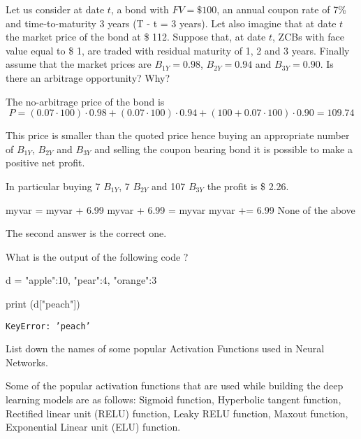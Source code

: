 \documentclass[12pt,a4paper]{exam}
\begin{document}
\question
Let us consider at date $t$, a bond with $FV = \$ 100$, an annual coupon rate of 7\% and time-to-maturity 3 years (T - t = 3 years).
Let also imagine that at date $t$ the market price of the bond at \$ 112.
Suppose that, at date $t$, ZCBs with face value equal to \$ 1, are traded with residual maturity of 1, 2 and 3 years.
Finally assume that the market prices are $B_{1Y} = 0.98$, $B_{2Y} = 0.94$ and $B_{3Y} = 0.90$.
Is there an arbitrage opportunity? Why?
\fillwithlines{3cm}
\begin{solution}
The no-arbitrage price of the bond is
\begin{equation*}
  P = (0.07\cdot100)\cdot 0.98 + (0.07\cdot100)\cdot 0.94 + (100 + 0.07\cdot100)\cdot 0.90 = 109.74
\end{equation*}

This price is smaller than the quoted price hence buying an appropriate number of $B_{1Y}$, $B_{2Y}$ and $B_{3Y}$ and selling the coupon bearing bond it is possible to make a positive net profit.

In particular buying 7 $B_{1Y}$, 7 $B_{2Y}$ and 107 $B_{3Y}$ the profit is \$ 2.26.
\end{solution}


\begin{checkboxes}
\choice myvar = myvar + 6.99
\choice myvar + 6.99 = myvar
\choice myvar += 6.99
\choice None of the above
\end{checkboxes}
\begin{solution}
The second answer is the correct one.
\end{solution}


\question
What is the output of the following code ?

\begin{ipython}
d = {"apple":10, "pear":4, "orange":3}

print (d["peach"])
\end{ipython}
\makeemptybox{3cm}
\begin{solution}
\texttt{KeyError: 'peach'}
\end{solution}
\question
List down the names of some popular Activation Functions used in Neural Networks.
\fillwithlines{3cm}
\begin{solution}
Some of the popular activation functions that are used while building the deep learning models are as follows:
Sigmoid function, Hyperbolic tangent function, Rectified linear unit (RELU) function, Leaky RELU function, Maxout function, Exponential Linear unit (ELU) function.
\end{solution}
\end{document}

